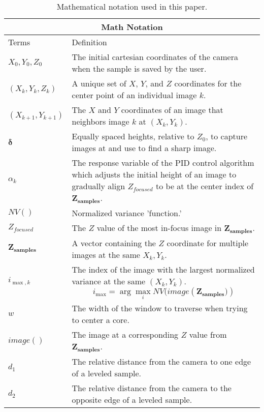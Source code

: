 \begin{table}[h]
    \centering
    \caption{Mathematical notation used in this paper.}
    \label{tab:math_notation}
    \begin{tabular}{ |p{3cm}||p{12cm}|  }
      \hline
      \multicolumn{2}{|c|}{Math Notation} \\
      \hline
      Terms & Definition\\
      \hline
      $X_0, Y_0, Z_0$   &The initial cartesian coordinates of the camera when the sample is saved by the user. \\
      $(X_k, Y_k, Z_k)$ & A unique set of $X$, $Y$, and $Z$ coordinates for the center point of an individual image $k$. \\
      $(X_{k+1}, Y_{k+1})$ & The $X$ and $Y$ coordinates of an image that neighbors image $k$ at $(X_k, Y_k)$. \\
      $\boldsymbol{\delta}$ & Equally spaced heights, relative to $Z_0$, to capture images at and use to find a sharp image. \\
      $\alpha_k$ & The response variable of the PID control algorithm which adjusts the initial height of an image to gradually align $Z_{focused}$ to be at the center index of $\boldsymbol{Z_{samples}}$.\\
      $NV()$ & Normalized variance 'function.' \\
      $Z_{focused}$ & The $Z$ value of the most in-focus image in $\boldsymbol{Z_{\text{samples}}}$. \\
      $\boldsymbol{Z_{\text{samples}}}$ & A vector containing the $Z$ coordinate for multiple images at the same $X_k, Y_k$. \\
      $i_{\max,k}$ & The index of the image with the largest normalized variance at the same $(X_k, Y_k)$. \[
      i_{\max} = \arg\max_{i} NV(image(\boldsymbol{{Z_\text{samples}})})
      \] \\
      $w$ & The width of the window to traverse when trying to center a core. \\
      $image()$ & The image at a corresponding $Z$ value from $\boldsymbol{Z_{\text{samples}}}$. \\
      $d_1$ & The relative distance from the camera to one edge of a leveled sample. \\
      $d_2$ & The relative distance from the camera to the opposite edge of a leveled sample. \\
      \hline
    \end{tabular}
    \end{table}